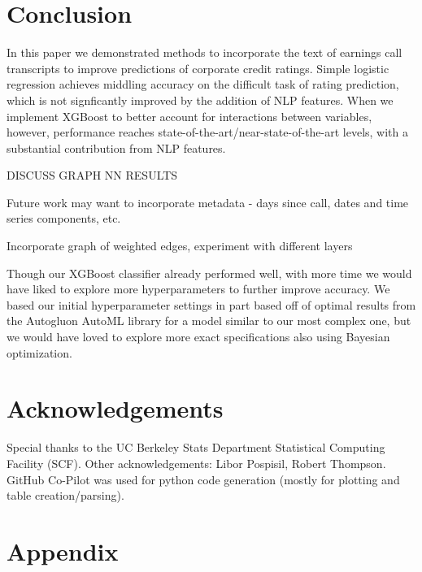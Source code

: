 \documentclass{article}[11pt]
\begin{document}
    \section*{Conclusion}

    In this paper we demonstrated methods to incorporate the text of earnings call transcripts to improve predictions of corporate credit ratings. Simple logistic regression achieves middling accuracy on the difficult task of rating prediction, which is not signficantly improved by the addition of NLP features. When we implement XGBoost to better account for interactions between variables, however, performance reaches state-of-the-art/near-state-of-the-art levels, with a substantial contribution from NLP features.

    DISCUSS GRAPH NN RESULTS

    Future work may want to incorporate metadata - days since call, dates and time series components, etc.

    Incorporate graph of weighted edges, experiment with different layers

    Though our XGBoost classifier already performed well, with more time we would have liked to explore more hyperparameters to further improve accuracy. We based our initial hyperparameter settings in part based off of optimal results from the Autogluon AutoML library \citep{erickson_autogluon_2024} for a model similar to our most complex one, but we would have loved to explore more exact specifications also using Bayesian optimization.

    \section*{Acknowledgements}

    Special thanks to the UC Berkeley Stats Department Statistical Computing Facility (SCF). Other acknowledgements: Libor Pospisil, Robert Thompson. GitHub Co-Pilot was used for python code generation (mostly for plotting and table creation/parsing).

    \clearpage
    \newpage

    
    

    \clearpage
    \newpage

    \appendix


    \section{Appendix}
\end{document}
